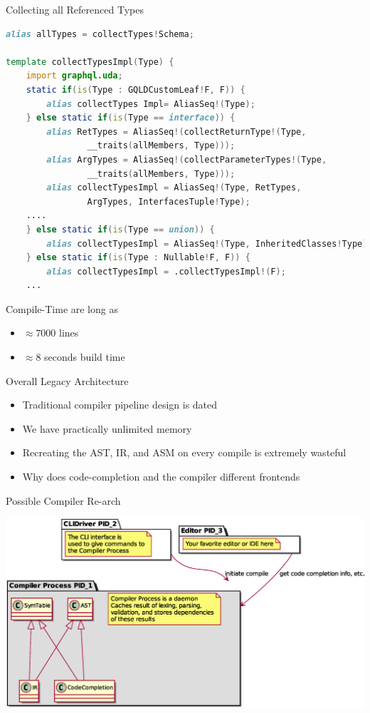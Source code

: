 \documentclass[aspectratio=169]{beamer}
\begin{document}
	\begin{frame}[fragile]{Collecting all Referenced Types}
\begin{lstlisting}[language=D,basicstyle=\scriptsize\ttfamily]
alias allTypes = collectTypes!Schema;

template collectTypesImpl(Type) {
	import graphql.uda;
	static if(is(Type : GQLDCustomLeaf!F, F)) {
		alias collectTypes Impl= AliasSeq!(Type);
	} else static if(is(Type == interface)) {
		alias RetTypes = AliasSeq!(collectReturnType!(Type,
				__traits(allMembers, Type)));
		alias ArgTypes = AliasSeq!(collectParameterTypes!(Type,
				__traits(allMembers, Type)));
		alias collectTypesImpl = AliasSeq!(Type, RetTypes, 
				ArgTypes, InterfacesTuple!Type);
	....
	} else static if(is(Type == union)) {
		alias collectTypesImpl = AliasSeq!(Type, InheritedClasses!Type);
	} else static if(is(Type : Nullable!F, F)) {
		alias collectTypesImpl = .collectTypesImpl!(F);
	...
\end{lstlisting}
	\end{frame}

	\begin{frame}[fragile]{Compile-Time are long as}
		\Large
		\begin{itemize}
			\item $\approx{} 7000$ lines
			\item $\approx{} 8$ seconds build time
		\end{itemize}
	\end{frame}

	\begin{frame}[fragile]{Overall Legacy Architecture}
		\Large
		\begin{itemize}
			\item Traditional compiler pipeline design is dated
				\pause
			\item We have practically unlimited memory
			\item Recreating the AST, IR, and ASM on every compile is extremely wasteful
			\item Why does code-completion and the compiler different frontends
		\end{itemize}
	\end{frame}

	\begin{frame}{Possible Compiler Re-arch}
		\begin{center}
		\includegraphics[height=0.9\textheight]{rearch.eps}
		\end{center}
	\end{frame}
\end{document}
